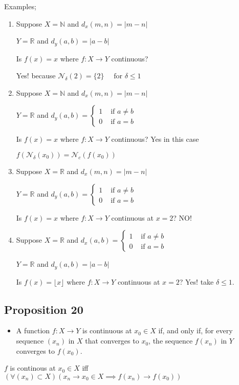 \documentclass[12pt,a4paper]{article}
\begin{document}
Examples;
\begin{enumerate}
    \item Suppose \(X = \mathbb{N}\) and \(d_{x}(m,n)=|m-n|\)
    
    \(Y = \mathbb{R}\) and \(d_{y}(a,b)=|a-b|\)   
    
    Is \(f(x)=x\) where \(f: X \to Y\) continuous?
    
    Yes! because \(\mathcal{N}_{\delta}(2)=\{2\} \quad \text{ for } \delta \leq 1\) 
    
    \item Suppose \(X = \mathbb{N}\) and \(d_{x}(m,n)=|m-n|\)
    
    \(Y = \mathbb{R}\) and \(d_{y}(a,b)=\begin{cases} 1 & \text{ if } a \neq b\\ 0 & \text{ if } a=b \end{cases}\)   
    
    Is \(f(x)=x\) where \(f: X \to Y\) continuous? Yes in this case  
    
    \(f\left(\mathcal{N}_\delta\left(x_0\right)\right) = \mathcal{N}_c\left(f\left(x_0\right)\right)\)
    
    \item Suppose \(X = \mathbb{R}\) and \(d_{x}(m,n)=|m-n|\)
    
    \(Y = \mathbb{R}\) and \(d_{y}(a,b)=\begin{cases} 1 & \text{ if } a \neq b\\ 0 & \text{ if } a=b \end{cases}\)   
    
    Is \(f(x)=x\) where \(f: X \to Y\) continuous at \(x=2\)? NO!
    
    \item Suppose \(X = \mathbb{R}\) and \(d_{x}(a,b)=\begin{cases} 1 & \text{ if } a \neq b\\ 0 & \text{ if } a=b \end{cases}\)   
    
    \(Y = \mathbb{R}\) and \(d_{y}(a,b)=|a-b| \)  
    
    Is \(f(x)=\lfloor x \rfloor \) where \(f: X \to Y\) continuous at \(x=2\)? Yes! take \(\delta \leq 1\).   

\end{enumerate}
\subsection{Proposition 20}
\begin{itemize}
    \item A function \(f: X \rightarrow Y\) is continuous at \(x_0 \in X\) if, and only if, for every sequence \(\left(x_n\right)\) in \(X\) that converges to \(x_0\), the sequence \(f\left(x_n\right)\) in \(Y\) converges to \(f\left(x_0\right)\).
\end{itemize}
\(f\) is continous at \(x_{0} \in X\) iff    
\(\left( \forall (x_{n}) \subset X \right)\left( x_{n} \to x_{0} \in X \implies f(x_{n}) \to f(x_{0}) \right)  \)  
\end{document}
